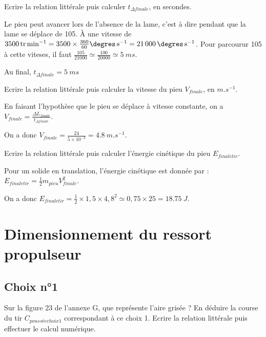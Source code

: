 \documentclass[11pt]{article}
\begin{document}
\UPSTIquestion Ecrire la relation littérale puis calculer $t_{\Delta finale}$, en secondes.
\begin{UPSTIcorrige}
Le pieu peut avancer lors de l'absence de la lame, c'est à dire pendant que la lame se déplace de \SI{105}{\degres}. 
À une vitesse de $\SI{3500}{tr.min^{-1}} = 3500\times \frac{360}{60} \si{\degres.s^{-1}} =   \SI{21000}{\degres.s^{-1}}$. Pour parcourur \SI{105}{\degres} à cette viteses, il faut $\frac{105}{21000} \simeq \frac{100}{20000} \simeq \SI{5}{ms}$. 

Au final, $t_{\Delta finale} = \SI{5}{ms} $
\end{UPSTIcorrige}

\UPSTIquestion Ecrire la relation littérale puis calculer la vitesse du pieu $V_{finale}$, en $\si{m.s^{-1}}$.

\begin{UPSTIcorrige}
En faisant l'hypothèse que le pieu se déplace à vitesse constante, on a $V_{finale} = \frac{\Delta L_{finale}}{t_{\Delta finale}}$.

On a donc $V_{finale} = \frac{24}{5 \times 10 ^{-3}}  = \SI{4,8}{m.s^{-1}}$. 


\end{UPSTIcorrige}

\UPSTIquestion Ecrire la relation littérale puis calculer l'énergie cinétique du pieu $E_{finale tir}$. 

\begin{UPSTIcorrige}
Pour un solide en translation, l'énergie cinétique est donnée par : $E_{finale tir} = \frac{1}{2}m_{pieu} V_{finale}^2$.

On a donc $E_{finale tir} = \frac{1}{2} \times 1,5 \times 4,8^2 \simeq 0,75 \times 25 = \SI{18,75}{J}$.

\end{UPSTIcorrige}

\section{Dimensionnement du ressort propulseur}
\subsection*{Choix n°1}

\UPSTIquestion* Sur la figure 23 de l'annexe G, que représente l'aire grisée ?
En déduire la course du tir $C_{poussée choix 1}$ correspondant à ce choix 1. Ecrire la relation littérale puis effectuer le calcul numérique. 
\end{document}
